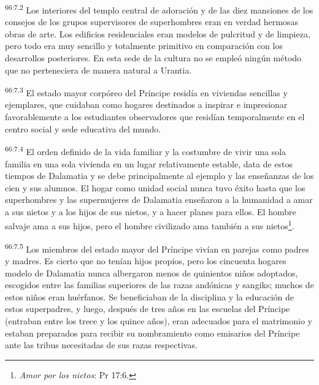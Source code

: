 \par
\textsuperscript{66:7.2} Los interiores del templo central de adoración y de las diez mansiones de los consejos de los grupos supervisores de superhombres eran en verdad hermosas obras de arte. Los edificios residenciales eran modelos de pulcritud y de limpieza, pero todo era muy sencillo y totalmente primitivo en comparación con los desarrollos posteriores. En esta sede de la cultura no se empleó ningún método que no perteneciera de manera natural a Urantia.

\par
\textsuperscript{66:7.3} El estado mayor corpóreo del Príncipe residía en viviendas sencillas y ejemplares, que cuidaban como hogares destinados a inspirar e impresionar favorablemente a los estudiantes observadores que residían temporalmente en el centro social y sede educativa del mundo.

\par
\textsuperscript{66:7.4} El orden definido de la vida familiar y la costumbre de vivir una sola familia en una sola vivienda en un lugar relativamente estable, data de estos tiempos de Dalamatia y se debe principalmente al ejemplo y las enseñanzas de los cien y sus alumnos. El hogar como unidad social nunca tuvo éxito hasta que los superhombres y las supermujeres de Dalamatia enseñaron a la humanidad a amar a sus nietos y a los hijos de sus nietos, y a hacer planes para ellos. El hombre salvaje ama a sus hijos, pero el hombre civilizado ama también a sus nietos\footnote{\textit{Amor por los nietos}: Pr 17:6.}.

\par
\textsuperscript{66:7.5} Los miembros del estado mayor del Príncipe vivían en parejas como padres y madres. Es cierto que no tenían hijos propios, pero los cincuenta hogares modelo de Dalamatia nunca albergaron menos de quinientos niños adoptados, escogidos entre las familias superiores de las razas andónicas y sangiks; muchos de estos niños eran huérfanos. Se beneficiaban de la disciplina y la educación de estos superpadres, y luego, después de tres años en las escuelas del Príncipe (entraban entre los trece y los quince años), eran adecuados para el matrimonio y estaban preparados para recibir su nombramiento como emisarios del Príncipe ante las tribus necesitadas de sus razas respectivas.

